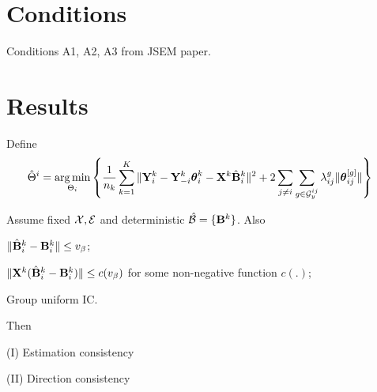 \documentclass[fleqn,11pt]{article}
\DeclareMathOperator*{\argmin}{arg\,min}
\numberwithin{equation}{section}
\begin{document}
\section{Conditions}
Conditions A1, A2, A3 from JSEM paper.

\section{Results}
Define
%
\begin{align}
\hat \Theta^i &= \argmin_{\Theta_i} \left\{ \frac{1}{n_k} \sum_{k=1}^K \| \bfY^k_i - \bfY_{-i}^k \bftheta_i^k - \bfX^k \hat \bfB_i^k \|^2 + 2 \sum_{j \neq i} \sum_{g \in \cG_y^{ij}} \lambda_{ij}^g \| \bftheta_{ij}^{[g]} \| \right\}
\end{align}

\begin{Theorem}\label{thm:ThetaThm}
Assume fixed ${\cal{X}}, {\cal{E}}$ and deterministic $\hat {{\cal{B}}} = \{ {\mathbf{B}}^k \}$. Also

 $\| \hat {{\mathbf{B}}}_i^k - {\mathbf{B}}_i^k \| \leq v_\beta$;

 $\| {\mathbf{X}}^k (\hat {{\mathbf{B}}}_i^k - {\mathbf{B}}_i^k ) \| \leq c(v_\beta)$ for some non-negative function $c(.)$;

Group uniform IC.

Then

\noindent (I) Estimation consistency

\noindent (II) Direction consistency 
\end{Theorem}
\end{document}
